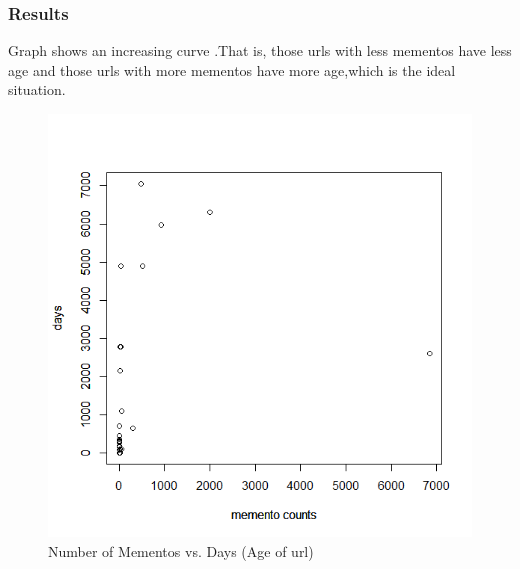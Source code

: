 \documentclass[letterpaper,11pt]{article}
\begin{document}
\subsubsection{ Results}
Graph shows an increasing curve .That is, those urls with less mementos have less age and those urls with more mementos have more age,which is the ideal situation.



\begin{figure}
\includegraphics[scale=0.56]{graph1.png}
\caption{Number of Mementos vs. Days (Age of url) }

\end{figure}


\nocite {*} 
\end{document}
